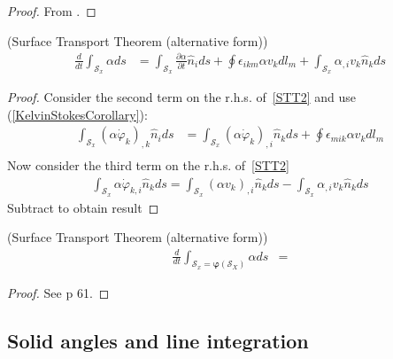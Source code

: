 \begin{proof}
From \cite{Scovazzi:2007tc}.
\end{proof}


\begin{mytheorem} (Surface Transport Theorem (alternative form))
\begin{align}
\frac{d}{dt}\int_{\mathcal{S}_x}\alpha ds&=\int_{\mathcal{S}_x}\frac{\partial \alpha}{\partial t}\hat{n}_ids+\oint\epsilon_{ikm}\alpha v_k dl_m+\int_{\mathcal{S}_x}\alpha_{,i} v_{k}\hat{n}_kds
\label{STT2L}
\end{align}
\end{mytheorem}

\begin{proof}
Consider the second term on the r.h.s. of~\ref{STT2} and use (\ref{KelvinStokesCorollary}):
\begin{align}
\int_{\mathcal{S}_x}\left(\alpha \dot \varphi_k\right)_{,k}\hat{n}_ids&=
\int_{\mathcal{S}_x}\left(\alpha \dot \varphi_k\right)_{,i}\hat{n}_kds+\oint\epsilon_{mik}\alpha v_k dl_m
\nonumber\\
\end{align}
Now consider the third term on the r.h.s. of~\ref{STT2} 
\begin{align}
\int_{\mathcal{S}_x}\alpha \dot\varphi_{k,i}\hat{n}_kds=\int_{\mathcal{S}_x}\left(\alpha v_{k}\right)_{,i}\hat{n}_kds-\int_{\mathcal{S}_x}\alpha_{,i} v_{k}\hat{n}_kds
\end{align}
Subtract to obtain result
\end{proof}


\begin{mytheorem} (Surface Transport Theorem (alternative form))
\begin{align}
\frac{d}{dt}\int_{\mathcal{S}_x=\bm \varphi (\mathcal{S}_X)}\alpha ds&=
\label{STT1}
\end{align}
\end{mytheorem}

\begin{proof}
See  \cite{Slattery:2006wn} p 61.
\end{proof}


\subsection{Solid angles and line integration}

